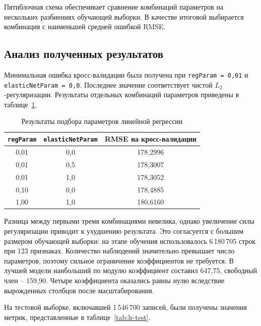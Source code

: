 Пятиблочная схема обеспечивает сравнение комбинаций параметров на нескольких разбиениях обучающей выборки. В качестве итоговой выбирается комбинация с наименьшей средней ошибкой RMSE.


\vspace{\baselineskip}\subsection{Анализ полученных результатов}\vspace{\baselineskip}

Минимальная ошибка кросс-валидации была получена при \texttt{regParam = 0,01} и \texttt{elasticNetParam = 0,0}. Последнее значение соответствует чистой $L_2$-регуляризации. Результаты отдельных комбинаций параметров приведены в таблице~\ref{tab:lr-cv}.

\begin{table}[H]
    \centering
    \caption{Результаты подбора параметров линейной регрессии}
    \label{tab:lr-cv}
    \small
    \begin{tabular}{|c|c|c|}
        \hline
        \centering\arraybackslash \texttt{regParam} & \centering\arraybackslash \texttt{elasticNetParam} & \centering\arraybackslash RMSE на кросс-валидации \\
        \hline
        0,01 & 0,0 & 178,2996 \\
        \hline
        0,01 & 0,5 & 178,3007 \\
        \hline
        0,01 & 1,0 & 178,3052 \\
        \hline
        0,10 & 0,0 & 178,4885 \\
        \hline
        1,00 & 1,0 & 180,6160 \\
        \hline
    \end{tabular}
\end{table}

Разница между первыми тремя комбинациями невелика, однако увеличение силы регуляризации приводит к ухудшению результата. Это согласуется с большим размером обучающей выборки: на этапе обучения использовалось 6\,180\,705 строк при 123 признаках. Количество наблюдений значительно превышает число параметров, поэтому сильное ограничение коэффициентов не требуется. В лучшей модели наибольший по модулю коэффициент составил 647,75, свободный член -- 159,90. Четыре коэффициента оказались равны нулю вследствие вырожденных столбцов после масштабирования.

На тестовой выборке, включавшей 1\,546\,700 записей, были получены значения метрик, представленные в таблице~\ref{tab:lr-test}.

